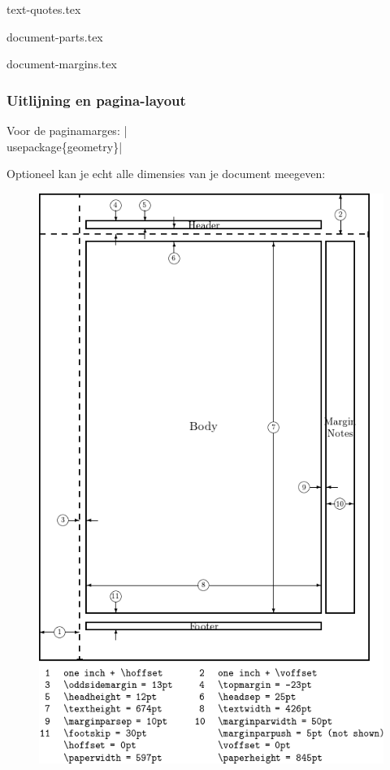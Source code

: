 \documentclass{cursuspresentatie}
\def\importslide#1#2{%
	{#2}
}
\begin{document}
\importslide{text}{text-quotes.tex}


\importslide{document}{document-parts.tex}

\importslide{document}{document-margins.tex}

\begin{frame}
	\frametitle{Uitlijning en pagina-layout}
	Voor de paginamarges: \hll|\\usepackage\{geometry\}|

	Optioneel kan je echt alle dimensies van je document meegeven:
	\begin{figure}
			\includegraphics[height=0.9\textheight]{assets/Layout-dimensions.png}
	\end{figure}
\end{frame}
\end{document}
